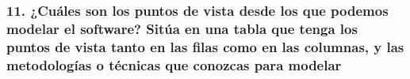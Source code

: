 \subsubsection*{11. ¿Cuáles son los puntos de vista desde los que podemos modelar el software? Sitúa en una tabla que tenga los puntos de vista tanto en las filas como en las columnas, y las metodologías o técnicas que conozcas para modelar}
\begin{table}[ht]
    \centering
\end{table}
